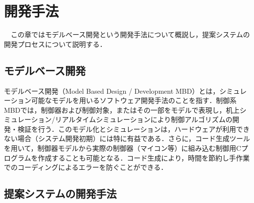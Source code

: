 \chapter{開発手法}
　この章ではモデルベース開発という開発手法について概説し，提案システムの開発プロセスについて説明する．

\section{モデルベース開発}
モデルベース開発（Model Based Design / Development MBD）とは，シミュレーション可能なモデルを用いるソフトウェア開発手法のことを指す．制御系MBDでは，制御器および制御対象，またはその一部をモデルで表現し，机上シミュレーション/リアルタイムシミュレーションにより制御アルゴリズムの開発・検証を行う．このモデル化とシミュレーションは，ハードウェアが利用できない場合（システム開発初期）には特に有益である．さらに，コード生成ツールを用いて，制御器モデルから実際の制御器（マイコン等）に組み込む制御用Cプログラムを作成することも可能となる．コード生成により，時間を節約し手作業でのコーディングによるエラーを防ぐことができる．\cite{MBD_Simulink}

\section{提案システムの開発手法}



